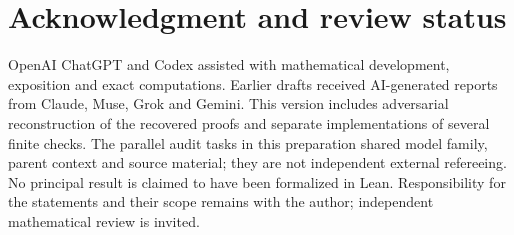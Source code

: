 \documentclass[11pt]{article}
\numberwithin{equation}{section}
\theoremstyle{definition}
\theoremstyle{remark}
\begin{document}
\section*{Acknowledgment and review status}
OpenAI ChatGPT and Codex assisted with mathematical development, exposition and exact computations. Earlier drafts received AI-generated reports from Claude, Muse, Grok and Gemini. This version includes adversarial reconstruction of the recovered proofs and separate implementations of several finite checks. The parallel audit tasks in this preparation shared model family, parent context and source material; they are not independent external refereeing. No principal result is claimed to have been formalized in Lean. Responsibility for the statements and their scope remains with the author; independent mathematical review is invited.
\clearpage
{}
\begingroup\raggedright\small
\end{document}
